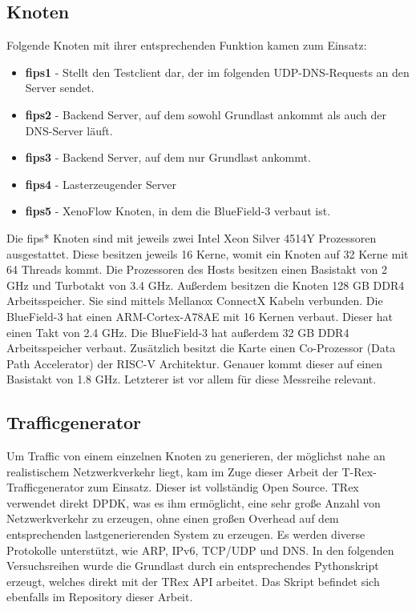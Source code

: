\subsection{Knoten}
Folgende Knoten mit ihrer entsprechenden Funktion kamen zum Einsatz:
\begin{itemize}
    \item \textbf{fips1} - Stellt den Testclient dar, der im folgenden UDP-DNS-Requests an den Server sendet.
    \item \textbf{fips2} - Backend Server, auf dem sowohl Grundlast ankommt als auch der DNS-Server läuft.
    \item \textbf{fips3} - Backend Server, auf dem nur Grundlast ankommt.
    \item \textbf{fips4} - Lasterzeugender Server
    \item \textbf{fips5} - XenoFlow Knoten, in dem die BlueField-3 verbaut ist.
\end{itemize}
Die fips* Knoten sind mit jeweils zwei Intel Xeon Silver 4514Y Prozessoren ausgestattet. Diese besitzen jeweils 16 Kerne, womit ein Knoten auf 32 Kerne mit 64 Threads kommt. Die Prozessoren des Hosts besitzen einen Basistakt von 2 GHz und Turbotakt von 3.4 GHz. Außerdem besitzen die Knoten 128 GB DDR4 Arbeitsspeicher. Sie sind mittels Mellanox ConnectX Kabeln verbunden. Die BlueField-3 hat einen ARM-Cortex-A78AE mit 16 Kernen verbaut. Dieser hat einen Takt von 2.4 GHz. Die BlueField-3 hat außerdem 32 GB DDR4 Arbeitsspeicher verbaut. Zusätzlich besitzt die Karte einen Co-Prozessor (Data Path Accelerator) der RISC-V Architektur. Genauer kommt dieser auf einen Basistakt von 1.8 GHz. Letzterer ist vor allem für diese Messreihe relevant. 
\subsection{Trafficgenerator}
Um Traffic von einem einzelnen Knoten zu generieren, der möglichst nahe an realistischem Netzwerkverkehr liegt, kam im Zuge dieser Arbeit der T-Rex-Trafficgenerator zum Einsatz. Dieser ist vollständig Open Source. TRex verwendet direkt DPDK, was es ihm ermöglicht, eine sehr große Anzahl von Netzwerkverkehr zu erzeugen, ohne einen großen Overhead auf dem entsprechenden lastgenerierenden System zu erzeugen. Es werden diverse Protokolle unterstützt, wie ARP, IPv6, TCP/UDP und DNS. In den folgenden Versuchsreihen wurde die Grundlast durch ein entsprechendes Pythonskript erzeugt, welches direkt mit der TRex API arbeitet. Das Skript befindet sich ebenfalls im Repository dieser Arbeit.
